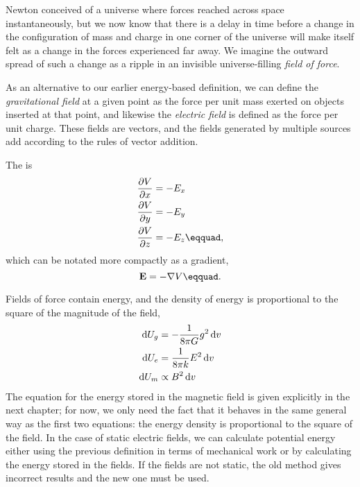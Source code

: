 	Newton conceived of a universe where forces reached across
	space instantaneously, but we now know that there is a delay
	in time before a change in the configuration of mass and
	charge in one corner of the universe will make itself felt
	as a change in the forces experienced far away. We imagine
	the outward spread of such a change as a ripple in an
	invisible universe-filling \emph{field of force}.
	
	As an alternative to our earlier energy-based definition, 
	we can define the \emph{gravitational field} at a given point as
	the force per unit mass exerted on objects inserted at that
	point, and likewise the \emph{electric field} is defined as
	the force per unit charge. These fields are vectors, and the
	fields generated by multiple sources add according to the
	rules of vector addition.
	
	The  is 
	\begin{align*}
		\frac{\partial V}{\partial x}	&= -E_x \\
		\frac{\partial V}{\partial y}	&= -E_y \\
		\frac{\partial V}{\partial z}	&= -E_z\eqquad,
	\end{align*}
	which can be notated more compactly as a gradient,
	\begin{equation*}
		\vc{E} = -\nabla V\eqquad.
	\end{equation*}
	
	Fields of force contain energy, and the density of energy is
	proportional to the square of the magnitude of the field,
	\begin{align*}
		\operatorname{d\!} U_g	&= -\frac{1}{8\pi G}g^2 \operatorname{d\!} v \\
		\operatorname{d\!} U_e	&= \frac{1}{8\pi k}E^2 \operatorname{d\!} v \\
		\operatorname{d\!} U_m	&\propto B^2 \operatorname{d\!} v
	\end{align*}
	The equation for the energy stored in the magnetic field is given explicitly
	in the next chapter; for now, we only need the fact that it behaves in the
	same general way as the first two equations: the energy density is proportional
	to the square of the field.
	In the case of static electric fields, we can calculate potential energy
	either using the previous definition in terms of mechanical
	work or by calculating the energy stored in the fields. If
	the fields are not static, the old method gives incorrect
	results and the new one must be used.
	
